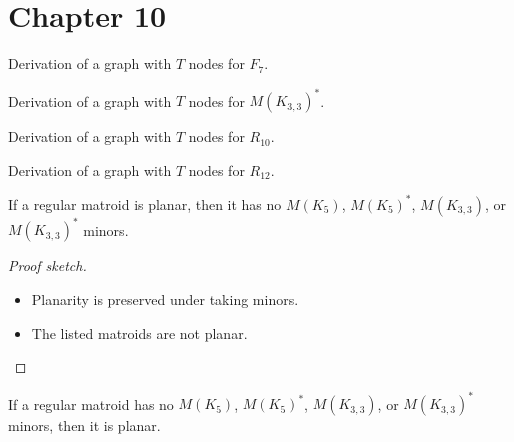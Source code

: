 \section{Chapter 10}

\begin{proposition}[10.2.4]
  \label{prop:10.2.4}
  Derivation of a graph with $T$ nodes for $F_{7}$.
\end{proposition}

\begin{proposition}[10.2.6]
  \label{prop:10.2.6}
  Derivation of a graph with $T$ nodes for $M(K_{3,3})^{*}$.
\end{proposition}

\begin{proposition}[10.2.8]
  \label{prop:10.2.8}
  Derivation of a graph with $T$ nodes for $R_{10}$.
\end{proposition}

\begin{proposition}[10.2.9]
  \label{prop:10.2.9}
  Derivation of a graph with $T$ nodes for $R_{12}$.
\end{proposition}

\begin{theorem}[10.2.11 only if]
  \label{thm:10.2.11.only_if}
  If a regular matroid is planar, then it has no $M(K_{5})$, $M(K_{5})^{*}$, $M(K_{3,3})$, or $M(K_{3,3})^{*}$ minors.
\end{theorem}

\begin{proof}[Proof sketch]
  \begin{itemize}
    \item Planarity is preserved under taking minors.
    \item The listed matroids are not planar.
  \end{itemize}
\end{proof}

\begin{theorem}[10.2.11 if]
  \label{thm:10.2.11.if}
  If a regular matroid has no $M(K_{5})$, $M(K_{5})^{*}$, $M(K_{3,3})$, or $M(K_{3,3})^{*}$ minors, then it is planar.
\end{theorem}

